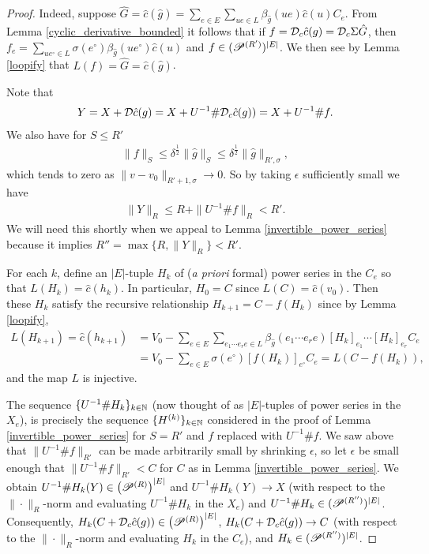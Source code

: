 \begin{proof}
Indeed, suppose $\hat{G}=\hat{c}(\hat{g}) = \sum_{e\in E}\sum_{ue\in L}\beta_{\hat{g}}(ue) \hat{c}(u) C_e$. From Lemma \ref{cyclic_derivative_bounded} it follows that if $f=\D_c \hat{c}(g) = \D_c \Sigma \hat{G}$, then $f_e = \sum_{ue^\circ\in L} \sigma(e^\circ)\beta_{\hat{g}}(ue^\circ) \hat{c}(u)$ and $f\in (\P^{(R')})^{|E|}$. We then see by Lemma \ref{loopify} that $L(f)=\hat{G}=\hat{c}(\hat{g})$. 

Note that
	\begin{align*}
		Y=X+ \D \hat{c}(g) = X+U^{-1}\# \D_c\hat{c}(g)) = X + U^{-1}\# f.
	\end{align*}
We also have for $S\leq R'$
	\begin{align*}
		\|f \|_S \leq  \delta^\frac{1}{2} \|\hat{g}\|_S \leq \delta^\frac{1}{2} \|\hat{g}\|_{R',\sigma},
	\end{align*}
which tends to zero as $\|v-v_0\|_{R'+1,\sigma}\to 0$. So by taking $\epsilon$ sufficiently small we have
	\begin{align*}
		\| Y\|_R \leq R + \|U^{-1}\#f\|_R < R'.
	\end{align*}
We will need this shortly when we appeal to Lemma \ref{invertible_power_series} because it implies $R''=\max\{R,\|Y\|_R\}<R'$.

For each $k$, define an $|E|$-tuple $H_k$ of (\textit{a priori} formal) power series in the $C_e$ so that $L(H_k)=\hat{c}(h_k)$. In particular, $H_0 = C$ since $L(C)=\hat{c}(v_0)$. Then these $H_k$ satisfy the recursive relationship $H_{k+1}=C-f(H_k)$ since by Lemma \ref{loopify},
\begin{align*}
L(H_{k+1})=\hat{c}(h_{k+1}) &= V_0 - \sum_{e\in E} \sum_{e_1\cdots e_r e\in L} \beta_{\hat{g}}(e_1\cdots e_r e) [H_k]_{e_1}\cdots [H_k]_{e_r} C_e \\
&= V_0 - \sum_{e\in E} \sigma(e^\circ) [f(H_k)]_{e^\circ} C_e = L(C - f(H_k)),
\end{align*}
and the map $L$ is injective.

The sequence $\{U^{-1}\# H_k\}_{k\in\N}$ (now thought of as $|E|$-tuples of power series in the $X_e$), is precisely the sequence $\{H^{(k)}\}_{k\in\N}$ considered in the proof of Lemma \ref{invertible_power_series} for $S=R'$ and $f$ replaced with $U^{-1}\# f$. We saw above that $\|U^{-1}\# f\|_{R'}$ can be made arbitrarily small by shrinking $\epsilon$, so let $\epsilon$ be small enough that $\|U^{-1}\# f\|_{R'}<C$ for $C$ as in Lemma \ref{invertible_power_series}. We obtain $U^{-1}\# H_k(Y)\in \left(\P^{(R)}\right)^{|E|}$ and $U^{-1}\# H_k(Y)\to X$  (with respect to the $\|\cdot\|_{R}$-norm and evaluating $U^{-1}\# H_k$ in the $X_e$) and $U^{-1}\# H_k\in (\P^{(R'')})^{|E|}$. Consequently, $H_k(C+\D_c\hat{c}(g))\in \left(\P^{(R)}\right)^{|E|}$, $H_k(C+\D_c\hat{c}(g))\rightarrow C$ (with respect to the $\|\cdot\|_{R}$-norm and evaluating $H_k$ in the $C_e$), and $H_k\in (\P^{(R'')})^{|E|}$.


\end{proof}
